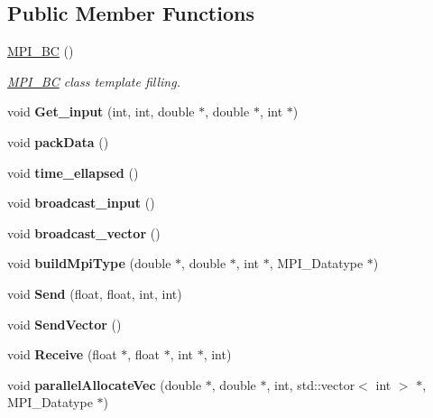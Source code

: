 \subsection*{Public Member Functions}
\begin{DoxyCompactItemize}
\item 
\hyperlink{classMPI__BC_a1c761fcc4df7e6809a0ffd2a20cebd12}{M\+P\+I\+\_\+\+BC} ()
\begin{DoxyCompactList}\small\item\em \hyperlink{classMPI__BC}{M\+P\+I\+\_\+\+BC} class template filling. \end{DoxyCompactList}\item 
\mbox{\label{classMPI__BC_ac1bbb11e2b7b546fea4fd25e3cdc1646}} 
void {\bfseries Get\+\_\+input} (int, int, double $\ast$, double $\ast$, int $\ast$)
\item 
\mbox{\label{classMPI__BC_ae489483851e7b20c09ffe112e514f25c}} 
void {\bfseries pack\+Data} ()
\item 
\mbox{\label{classMPI__BC_a833339bd5f16e9d09c1ae15f2870c175}} 
void {\bfseries time\+\_\+ellapsed} ()
\item 
\mbox{\label{classMPI__BC_a336da02d01deace3059d280a5d797d46}} 
void {\bfseries broadcast\+\_\+input} ()
\item 
\mbox{\label{classMPI__BC_a71eb5c66f0072f0c55c8975898eb8edb}} 
void {\bfseries broadcast\+\_\+vector} ()
\item 
\mbox{\label{classMPI__BC_a040c0384ca72ca971eeea94a7e90aa05}} 
void {\bfseries build\+Mpi\+Type} (double $\ast$, double $\ast$, int $\ast$, M\+P\+I\+\_\+\+Datatype $\ast$)
\item 
\mbox{\label{classMPI__BC_a2134566ddece0822a5e3714b3ec13c20}} 
void {\bfseries Send} (float, float, int, int)
\item 
\mbox{\label{classMPI__BC_ada7b741145acc727755fa5dfabbc9575}} 
void {\bfseries Send\+Vector} ()
\item 
\mbox{\label{classMPI__BC_a64ce44132cb41a0cd45ac15601bba6a2}} 
void {\bfseries Receive} (float $\ast$, float $\ast$, int $\ast$, int)
\item 
\mbox{\label{classMPI__BC_a7bfcbf6d2b35ef6894dca53ac4b14af1}} 
void {\bfseries parallel\+Allocate\+Vec} (double $\ast$, double $\ast$, int, std\+::vector$<$ int $>$ $\ast$, M\+P\+I\+\_\+\+Datatype $\ast$)
\end{DoxyCompactItemize}


